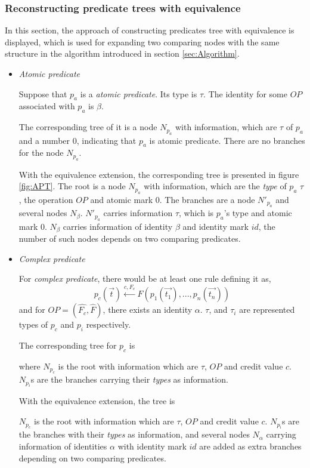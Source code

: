 \subsubsection{Reconstructing predicate trees with equivalence}
\label{sec:ReConstruct}
In this section, the approach of constructing predicates tree with equivalence is displayed, which is used for expanding two comparing nodes with the same structure in the algorithm introduced in section \ref{sec:Algorithm}.

%

\begin{itemize}
 \item \textit{Atomic predicate}

Suppose that $p_a$ is a \textit{atomic predicate}. Its type is $\tau$. The identity for some $OP$ associated with $p_a$ is $\beta$. 

The corresponding tree of it is a node $N_{p_a}$ with information, which are $\tau$ of $p_a$ and a number $0$, indicating that $p_a$ is atomic predicate. There are no branches for the node $N_{p_a}$. 

With the equivalence extension, the corresponding tree is presented in figure \ref{fig:APT}. The root is a node $N_{p_a}$ with information, which are the \textit{type} of $p_a$ $\tau$, the operation $OP$ and atomic mark $0$. The branches are a node $N'_{p_a}$ and several nodes $N_{\beta}$.  $N'_{p_a}$ carries information $\tau$, which is $p_a$'s type and atomic mark $0$. $N_{\beta}$ carries information of identity $\beta$ and identity mark $id$, the number of such nodes depends on two comparing predicates.



 \item \textit{Complex predicate}

For \textit{complex predicate}, there would be at least one rule defining it as,
\[p_c(\vec{t}) \stackrel{c,F_c}{\longleftarrow}F(p_1(\vec{t_1}),...,p_n(\vec{t_n}))\]
and for $OP=(\hat{F_c},\hat{F})$, there exists an identity $\alpha$.  $\tau$, and $\tau_{i}$ are represented types of $p_c$ and $p_{i}$ respectively.

The corresponding tree for $p_c$ is



where $N_{p_c}$ is the root with information which are $\tau$, $OP$ and credit value $c$. $N_{p_i}$s are the branches carrying their \textit{types} as information.

With the equivalence extension, the tree is 


 $N_{p_c}$ is the root with information which are $\tau$, $OP$ and credit value $c$. $N_{p_i}$s are the branches with their \textit{types} as information, and several nodes $N_{\alpha}$ carrying information of identities $\alpha$ with identity mark $id$ are added as extra branches depending on two comparing predicates.
\end{itemize}

